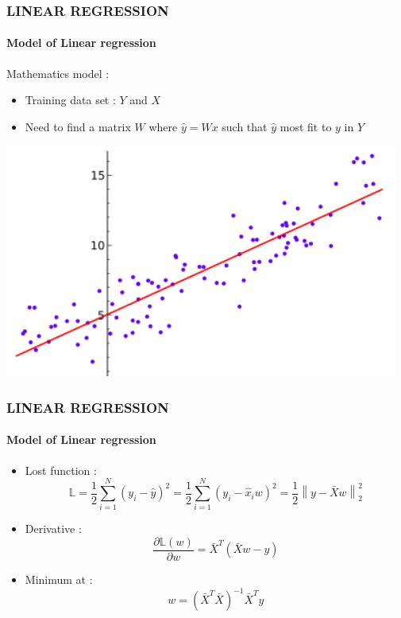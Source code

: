\documentclass[11pt]{beamer}
\begin{document}
\begin{frame}
	\frametitle{\textbf{LINEAR REGRESSION}}
	\framesubtitle{Model of Linear regression}
	 \begin{minipage}[c]{0.5\textwidth}
		  Mathematics model : 
			\pause
	\begin{itemize}
		\item Training data set : $Y$ and $X$
			\pause
		\item Need to find a matrix $W$ where $\hat{y} = Wx $ such that $\hat{y}$ most fit to $y$ in $Y$
	\end{itemize} 
	\end{minipage}		  
	\begin{minipage}{0.48\textwidth}		
		\includegraphics[width=\textwidth]{LR1.png} 
	\end{minipage}
	
\end{frame}
\begin{frame}
	\frametitle{\textbf{LINEAR REGRESSION}}
	\framesubtitle{Model of Linear regression}
	\begin{itemize}
		\item Lost function : 
		$$ \mathbb{L} = \dfrac{1}{2}\sum_{i=1}^N(y_i-\hat{y})^2 = \dfrac{1}{2}\sum_{i=1}^N(y_i-\hat{x}_iw)^2 = \dfrac{1}{2}\left\|y-\bar{X}w\right\|^2_2 $$
			\pause
		\item Derivative : 
		$$  \dfrac{\partial\mathbb{L}(w)}{\partial w} = \bar{X}^T \left( \bar{X}w-y \right) $$
			\pause
		\item Minimum at :  $$ w = \left(\bar{X}^T\bar{X}\right)^{-1}\bar{X}^Ty $$
	\end{itemize}

\end{frame}
\end{document}
